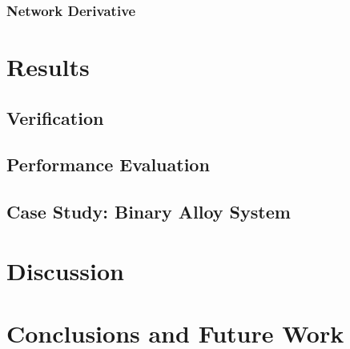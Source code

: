 \documentclass[a4paper,11pt,oneside]{article}
\begin{document}
\subsubsection{Network Derivative}

\section{Results}
\subsection{Verification}

\subsection{Performance Evaluation}

\subsection{Case Study: Binary Alloy System}

\section{Discussion}

\section{Conclusions and Future Work}


\newpage
\printbibliography
\end{document}
